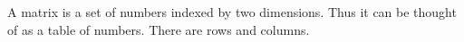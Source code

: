 



A matrix is a set of numbers
indexed by two dimensions.
Thus it can be thought of as
a table of numbers.
There are rows and columns.
